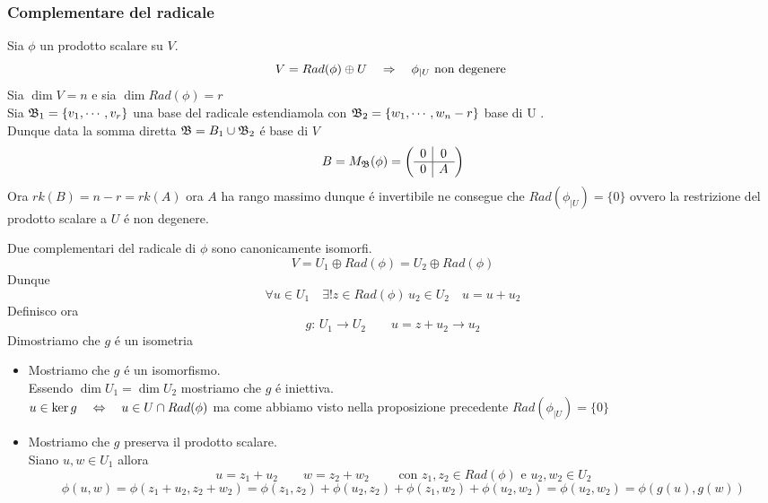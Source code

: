 \subsubsection{Complementare del radicale}
\begin{prop}
Sia $\phi$ un prodotto scalare su $V$.\\
$$ V = Rad ( \phi) \oplus U \quad \Rightarrow \quad \phi_{\vert U } \text{ non degenere } $$
\proof
Sia $\dim V = n $ e sia $\dim Rad(\phi)= r $ \\
Sia $\mathfrak{B} _1=\{ v_1 , \cdots , v_r \} $ una base del radicale estendiamola con $\mathfrak{B}_2 =\{ w_1, \cdots , w_n-r\} $ base di U .\\
Dunque data la somma diretta $\mathfrak{B}=B_1\cup \mathfrak{B}_2$ \'e base di $V $
$$ B= M_{\mathfrak{B}}(\phi) = \left( \begin{array}{c|c} 0 & 0 \\ \hline 0&A 
\end{array} \right) $$
Ora $rk (B) = n - r  = rk(A) $ ora $A$ ha rango massimo dunque \'e invertibile ne consegue che $Rad( \phi_{\vert U }) =\{ 0 \} $ ovvero la restrizione del prodotto scalare a $U $ \'e non degenere.\\
\endproof
\end{prop}
\spazio
\begin{prop}Due complementari del radicale di $\phi$ sono canonicamente isomorfi.
\proof
$$ V = U_1 \oplus Rad (\phi ) = U_2 \oplus Rad(\phi)$$
Dunque $$\forall u \in U_1  \quad \exists ! z \in Rad (\phi) \, u_2 \in U_2 \quad u = u+u_2 $$ 
Definisco ora $$g:\, U_1 \to U_2 \qquad u = z+u_2 \to u_2 $$
Dimostriamo che $g$ \'e un isometria
\begin{itemize}
\item Mostriamo che $g$ \'e un isomorfismo.\\
Essendo $\dim U_1 = \dim U_2 $ mostriamo che $g$ \'e iniettiva.\\
$ u \in \ker g \quad \Leftrightarrow \quad u \in  U \cap Rad(\phi) $ ma come abbiamo visto nella proposizione precedente $Rad ( \phi_{\vert U })=\{ 0 \} $
\item Mostriamo che $g$ preserva il prodotto scalare.\\
Siano $u, w \in U_1 $ allora 
$$ u = z_1 + u_2 \qquad w=z_2 + w_2 \qquad \text{ con } z_1, z_2 \in Rad(\phi ) \text{ e } u_2, w_2 \in U_2$$
$$ \phi(u,w)= \phi(z_1+u_2, z_2+w_2)= \phi(z_1, z_2)+ \phi(u_2, z_2)+ \phi(z_1, w_2) + \phi(u_2, w_2)= \phi(u_2,w_2)= \phi(g(u), g(w))$$
\end{itemize} 
\end{prop}
\newpage
